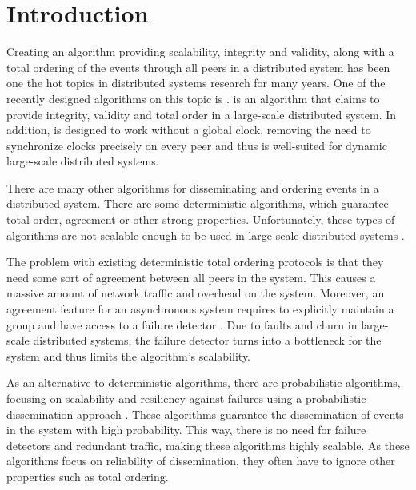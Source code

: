 \section{Introduction}

Creating an algorithm providing scalability, integrity and validity, along with a total ordering of the events through all peers in a distributed system has been one the hot topics in distributed systems research for many years. One of the recently designed algorithms on this topic is \epto \autocite{matos2015epto}. \epto is an algorithm that claims to provide integrity, validity and total order in a large-scale distributed system. In addition, \epto is designed to work without a global clock, removing the need to synchronize clocks precisely on every peer and thus is well-suited for dynamic large-scale distributed systems.
\par 
There are many other algorithms for disseminating and ordering events in a distributed system. There are some deterministic algorithms, which guarantee total order, agreement or other strong properties. Unfortunately, these types of algorithms are not scalable enough to be used in large-scale distributed systems \autocites[]{defago2004total}[]{lamport1978time}.
\par
The problem with existing deterministic total ordering protocols is that they need some sort of agreement between all peers in the system. This causes a massive amount of network traffic and overhead on the system.
Moreover, an agreement feature for an asynchronous system requires to
explicitly maintain a group and have access to a failure detector \autocites[]{chandra1996weakest}[]{chandra1996unreliable}. Due to faults and churn in large-scale distributed systems, the failure detector turns into a bottleneck for the system and thus limits the algorithm's scalability. 
\par
As an alternative to deterministic algorithms, there are probabilistic algorithms, focusing on scalability and resiliency against failures using a probabilistic dissemination approach  \autocites []{birman1999bimodal}[]{carvalho2007emergent}[]{demers1987epidemic}[]{eugster2003lightweight}[]{felber2002probabilistic}[]{hayden1996probabilistic}[]{kim2004gossip}[]{Koldehofe02simplegossiping}. These algorithms guarantee the dissemination of events in the system with high probability. This way, there is no need for failure detectors and redundant traffic, making these algorithms highly scalable. As these algorithms focus on reliability of dissemination, they often have to ignore other properties such as total ordering.
